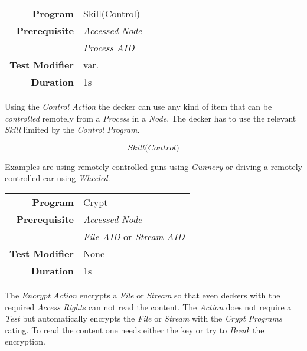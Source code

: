 \label{par:control}

\begin{tabular}{rl}
    \textbf{Program}       & Skill(Control)              \\
    \textbf{Prerequisite}  & \emph{Accessed} \emph{Node} \\
                           & \emph{Process} \emph{AID}   \\
    \textbf{Test Modifier} & var.                        \\
    \textbf{Duration}      & 1s                          \\
\end{tabular}

\hfill

Using the \emph{Control Action} the decker can use any kind of item that can be
\emph{controlled} remotely from a \emph{Process} in a \emph{Node}. The decker has
to use the relevant \emph{Skill} limited by the \emph{Control Program}.

\begin{equation*}
    \textit{Skill(Control)}
\end{equation*}

Examples are using remotely controlled guns using \emph{Gunnery} or driving a
remotely controlled car using \emph{Wheeled}.

\label{par:encrypt}

\begin{tabular}{rl}
    \textbf{Program}       & Crypt                                \\
    \textbf{Prerequisite}  & \emph{Accessed} \emph{Node}          \\
                           & \emph{File AID} or \emph{Stream AID} \\
    \textbf{Test Modifier} & None                                 \\
    \textbf{Duration}      & 1s                                   \\
\end{tabular}

\hfill

The \emph{Encrypt Action} encrypts a \emph{File} or \emph{Stream} so that even
deckers with the required \emph{Access Rights} can not read the content. The
\emph{Action} does not require a \emph{Test} but automatically encrypts the
\emph{File} or \emph{Stream} with the \emph{Crypt Programs} rating.
To read the content one needs either the key or try to \emph{Break} the encryption.



